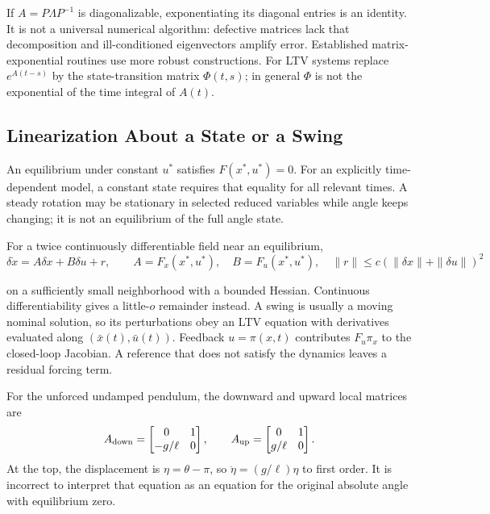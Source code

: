 If $A=P\Lambda P^{-1}$ is diagonalizable, exponentiating its diagonal entries is an identity. It is not a universal numerical algorithm: defective matrices lack that decomposition and ill-conditioned eigenvectors amplify error. Established matrix-exponential routines use more robust constructions. For LTV systems replace $e^{A(t-s)}$ by the state-transition matrix $\Phi(t,s)$; in general $\Phi$ is not the exponential of the time integral of $A(t)$.

\subsection{Linearization About a State or a Swing}
\label{sec:equilibrium}
\label{def:equilibrium_def}
\label{eq:equilibrium_condition}
\label{subsec:linearization}
\label{eq:jacobian_def}

An equilibrium under constant $u^*$ satisfies $F(x^*,u^*)=0$. For an explicitly time-dependent model, a constant state requires that equality for all relevant times. A steady rotation may be stationary in selected reduced variables while angle keeps changing; it is not an equilibrium of the full angle state.

For a twice continuously differentiable field near an equilibrium,
\begin{equation}
\label{eq:linearized_dynamics}
 \delta\dot x=A\delta x+B\delta u+r,\qquad
 A=F_x(x^*,u^*),\quad B=F_u(x^*,u^*),\quad
 \|r\|\leq c(\|\delta x\|+\|\delta u\|)^2
\end{equation}

on a sufficiently small neighborhood with a bounded Hessian. Continuous differentiability gives a little-$o$ remainder instead. A swing is usually a moving nominal solution, so its perturbations obey an LTV equation with derivatives evaluated along $(\bar x(t),\bar u(t))$. Feedback $u=\pi(x,t)$ contributes $F_u\pi_x$ to the closed-loop Jacobian. A reference that does not satisfy the dynamics leaves a residual forcing term.

For the unforced undamped pendulum, the downward and upward local matrices are
\begin{equation}
\label{eq:pendulum_linearizations}
 A_{\rm down}=\begin{bmatrix}0&1\\-g/\ell&0\end{bmatrix},\qquad
 A_{\rm up}=\begin{bmatrix}0&1\\g/\ell&0\end{bmatrix}.
\end{equation}
\label{ex:pendulum_linearization}
At the top, the displacement is $\eta=\theta-\pi$, so $\ddot\eta=(g/\ell)\eta$ to first order. It is incorrect to interpret that equation as an equation for the original absolute angle with equilibrium zero.

